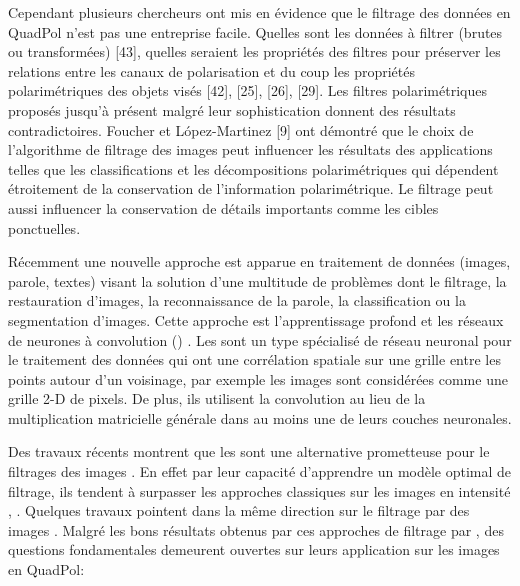 

Cependant plusieurs chercheurs ont mis en évidence que le filtrage des données en QuadPol n’est pas une entreprise facile. Quelles sont les données à filtrer (brutes ou transformées) [43], quelles seraient les propriétés des filtres pour préserver les relations entre les canaux de polarisation et du coup les propriétés polarimétriques des objets visés [42], [25], [26], [29]. Les filtres polarimétriques proposés jusqu’à présent malgré leur sophistication donnent des résultats contradictoires. Foucher et López-Martinez [9] ont démontré que le choix de l’algorithme de filtrage des images \acrpolsar peut influencer les résultats des applications telles que les classifications et les décompositions polarimétriques qui dépendent étroitement de la conservation de l’information polarimétrique. Le filtrage peut aussi influencer la conservation de détails importants comme les cibles ponctuelles. 

Récemment une nouvelle approche est apparue en traitement de données (images, parole, textes) visant la solution d’une multitude de problèmes dont le filtrage, la restauration d’images, la reconnaissance de la parole, la classification ou la segmentation d’images.  Cette approche est l’apprentissage profond et les réseaux de neurones à convolution (\acrconvnetns) \cite{LeCun1998}.  Les \acrconvnet sont un type spécialisé de réseau neuronal pour le traitement des données qui ont une corrélation spatiale sur une grille entre les points autour d’un voisinage, par exemple les images sont considérées comme une grille 2-D de pixels. De plus, ils utilisent la convolution au lieu de la multiplication matricielle générale dans au moins une de leurs couches neuronales.    

Des travaux récents montrent que les \acrconvnet sont une alternative prometteuse pour le filtrages des images \acrsarns.  En effet par leur capacité d’apprendre un modèle optimal de filtrage, ils tendent à surpasser les approches classiques sur les images \acrsar en intensité \cite{Chierchia2017SARCNN}, \cite{Zhang2018LearningSAR-DRN}. Quelques travaux pointent dans la même direction sur le filtrage par \acrconvnet des images  \acrpolsar \cite{Foucher2017}.  Malgré les bons résultats obtenus par ces approches de filtrage par \acrconvnetns,  des questions fondamentales demeurent ouvertes sur leurs application sur les images en QuadPol: 

